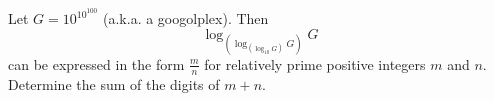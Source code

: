 Let $G=10^{10^{100}}$ (a.k.a. a googolplex). Then \[\log_{\left(\log_{\left(\log_{10} G\right)} G\right)} G\] can be expressed in the form $\frac{m}{n}$ for relatively prime positive integers $m$ and $n$. Determine the sum of the digits of $m+n$.
